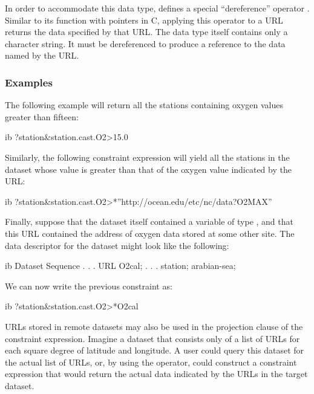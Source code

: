 In order to accommodate this data type, \opendap defines a special
``dereference''  operator \ind{\lit{*}}. Similar to
its function with pointers in C, applying this operator to a URL
returns the data specified by that URL. The  data type
itself contains only a character string. It must be dereferenced to
produce a reference to the data named by the URL.

\subsubsection{Examples}

The following example will return all the stations containing oxygen
values greater than fifteen:

\begin{vcode}{ib}
?station&station.cast.O2>15.0
\end{vcode}

Similarly, the following constraint expression will yield all the
stations in the dataset whose value is greater than that of the
oxygen value indicated by the URL:

\begin{vcode}{ib}
?station&station.cast.O2>*''http://ocean.edu/etc/nc/data?O2MAX''
\end{vcode}

Finally, suppose that the dataset itself contained a variable of type
, and that this URL contained the address of oxygen data
stored at some other site. The data descriptor for the dataset might
look like the following:


\begin{vcode}{ib}
Dataset {
   Sequence{
       .
       .
       .
      URL O2cal;
       .
       .
       .
   } station;
} arabian-sea;
\end{vcode}


We can now write the previous constraint as:

\begin{vcode}{ib}
?station&station.cast.O2>*O2cal
\end{vcode}

URLs stored in remote datasets may also be used in the projection
clause of the constraint expression. Imagine a dataset that consists
only of a list of URLs for each square degree of latitude and
longitude. A user could query this dataset for the actual list of
URLs, or, by using the \lit{*} operator, could construct a constraint
expression that would return the actual data indicated by the URLs in
the target dataset.

